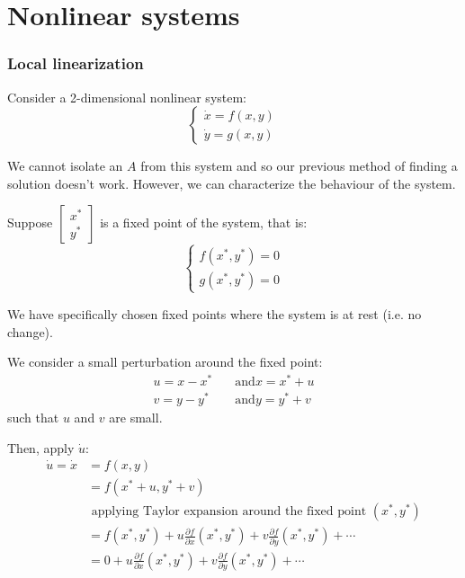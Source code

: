 \chapter{Nonlinear systems}
\subsection{Local linearization}

Consider a 2-dimensional nonlinear system:
\begin{equation*}
\begin{cases}
\dot{x} = f(x, y) \\
\dot{y} = g(x, y)
\end{cases}
\end{equation*}

We cannot isolate an $A$ from this system and so our previous method of finding a solution doesn't work. However, we can characterize the behaviour of the system.

Suppose $
\begin{bmatrix}
x^{*} \\
y^{*}
\end{bmatrix}
$
is a fixed point of the system, that is:
\begin{equation*}
\begin{cases}
f(x^{*}, y^{*}) = 0 \\
g(x^{*}, y^{*}) = 0
\end{cases}
\end{equation*}

We have specifically chosen fixed points where the system is at rest (i.e. no change).

We consider a small perturbation around the fixed point:
\begin{align*}
u = x - x^{*} \quad &\text{and} x = x^{*} + u \\ 
v = y - y^{*} \quad &\text{and} y = y^{*} + v
\end{align*}
such that $u$ and $v$ are small.

Then, apply $\dot{u}$:
\begin{align*}
\dot{u} = \dot{x} &= f(x, y) \\
&= f(x^{*} + u, y^{*} + v) \\
&\text{ applying Taylor expansion around the fixed point } (x^{*}, y^{*}) \\
&= f(x^{*}, y^{*}) + u \frac{\partial f}{\partial x} (x^{*}, y^{*}) + v \frac{\partial f}{\partial y} (x^{*}, y^{*}) + \cdots \\
&= 0 + u \frac{\partial f}{\partial x} (x^{*}, y^{*}) + v \frac{\partial f}{\partial y} (x^{*}, y^{*}) + \cdots
\end{align*}

